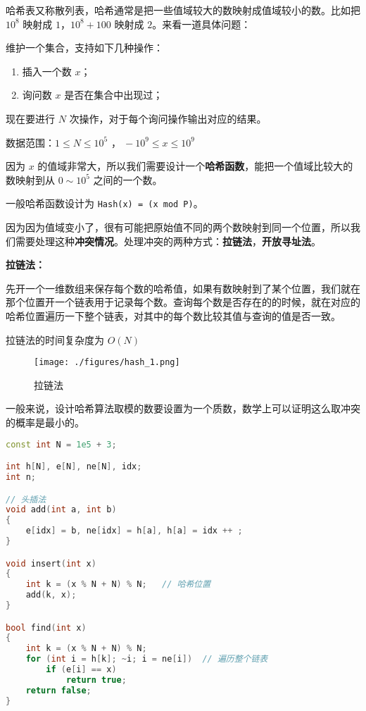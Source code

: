 
哈希表又称散列表，哈希通常是把一些值域较大的数映射成值域较小的数。比如把 $10^8$ 映射成 $1$，$10^8 + 100$ 映射成 $2$。来看一道具体问题：

维护一个集合，支持如下几种操作：

\begin{enumerate}
\item 插入一个数 $x$；

\item 询问数 $x$ 是否在集合中出现过；

\end{enumerate}
现在要进行 $N$ 次操作，对于每个询问操作输出对应的结果。

数据范围：$ 1 \le N \le 10^5$ ，$\ -10^9 \le x \le 10^9$

因为 $x$ 的值域非常大，所以我们需要设计一个\textbf{哈希函数}，能把一个值域比较大的数映射到从 $0 \sim 10^5$ 之间的一个数。

一般哈希函数设计为 \verb|Hash(x) = (x mod P)|。

因为因为值域变小了，很有可能把原始值不同的两个数映射到同一个位置，所以我们需要处理这种\textbf{冲突情况}。处理冲突的两种方式：\textbf{拉链法}，\textbf{开放寻址法}。

\textbf{拉链法：}

先开一个一维数组来保存每个数的哈希值，如果有数映射到了某个位置，我们就在那个位置开一个链表用于记录每个数。查询每个数是否存在的的时候，就在对应的哈希位置遍历一下整个链表，对其中的每个数比较其值与查询的值是否一致。

拉链法的时间复杂度为 $O(N)$
\begin{figure}[ht]
\centering
\texttt{[image: ./figures/hash\_1.png]}
\caption{拉链法} \label{hash_fig1}
\end{figure}

一般来说，设计哈希算法取模的数要设置为一个质数，数学上可以证明这么取冲突的概率是最小的。
\begin{lstlisting}[language=cpp]
const int N = 1e5 + 3;

int h[N], e[N], ne[N], idx;
int n;

// 头插法
void add(int a, int b)
{
    e[idx] = b, ne[idx] = h[a], h[a] = idx ++ ;
}

void insert(int x)
{
    int k = (x % N + N) % N;   // 哈希位置
    add(k, x);
}

bool find(int x)
{
    int k = (x % N + N) % N;
    for (int i = h[k]; ~i; i = ne[i])  // 遍历整个链表
        if (e[i] == x)
            return true;
    return false;
}
\end{lstlisting}


